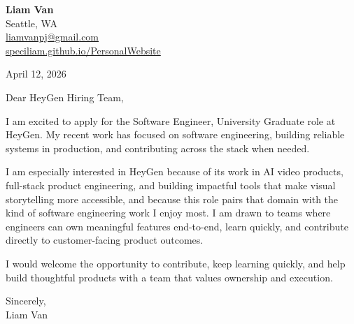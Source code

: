 \documentclass[letterpaper,11pt]{article}
\begin{document}
\begin{flushleft}
\textbf{\Large Liam Van} \\
Seattle, WA \\
\href{mailto:liamvanpj@gmail.com}{liamvanpj@gmail.com} \\
\href{https://speciliam.github.io/PersonalWebsite}{speciliam.github.io/PersonalWebsite}
\end{flushleft}

April 12, 2026

\noindent Dear HeyGen Hiring Team,

\noindent I am excited to apply for the Software Engineer, University Graduate role at HeyGen. My recent work has focused on software engineering, building reliable systems in production, and contributing across the stack when needed.

\noindent I am especially interested in HeyGen because of its work in AI video products, full-stack product engineering, and building impactful tools that make visual storytelling more accessible, and because this role pairs that domain with the kind of software engineering work I enjoy most. I am drawn to teams where engineers can own meaningful features end-to-end, learn quickly, and contribute directly to customer-facing product outcomes.

\noindent I would welcome the opportunity to contribute, keep learning quickly, and help build thoughtful products with a team that values ownership and execution.

\noindent Sincerely, \\
Liam Van
\end{document}
